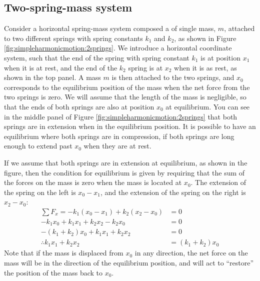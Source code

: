 \subsection{Two-spring-mass system}
Consider a horizontal spring-mass system composed a of single mass, $m$, attached to two different springs with spring constants $k_1$ and $k_2$, as shown in Figure \ref{fig:simpleharmonicmotion:2springs}.
We introduce a horizontal coordinate system, such that the end of the spring with spring constant $k_1$ is at position $x_1$ when it is at rest, and the end of the $k_2$ spring is at $x_2$ when it is as rest, as shown in the top panel. A mass $m$ is then attached to the two springs, and $x_0$ corresponds to the equilibrium position of the mass when the net force from the two springs is zero. We will assume that the length of the mass is negligible, so that the ends of both springs are also at position $x_0$ at equilibrium. You can see in the middle panel of Figure \ref{fig:simpleharmonicmotion:2springs} that both springs are in extension when in the equilibrium position. It is possible to have an equilibrium where both springs are in compression, if both springs are long enough to extend past $x_0$ when they are at rest. 

If we assume that both springs are in extension at equilibrium, as shown in the figure, then the condition for equilibrium is given by requiring that the sum of the forces on the mass is zero when the mass is located at $x_0$. The extension of the spring on the left is $x_0 - x_1$, and the extension of the spring on the right is $x_2-x_0$:
\begin{align*}
\sum F_x = -k_1(x_0-x_1) + k_2 (x_2 - x_0) &= 0\\
-k_1x_0+k_1x_1+k_2x_2-k_2x_0 &=0\\
-(k_1+k_2)x_0 +k_1x_1+k_2x_2 &=0\\
\therefore k_1x_1+k_2x_2 &=(k_1+k_2)x_0
\end{align*}
Note that if the mass is displaced from $x_0$ in any direction, the net force on the mass will be in the direction of the equilibrium position, and will act to ``restore'' the position of the mass back to $x_0$. 

